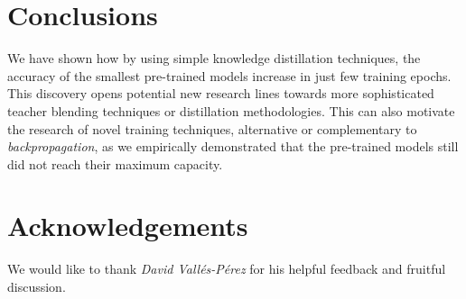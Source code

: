 \documentclass{elsarticle}
\begin{document}
	\section{Conclusions}  \label{sec:conclusions}
	We have shown how by using simple knowledge distillation techniques, the accuracy of the smallest pre-trained models increase in just few training epochs. This discovery opens potential new research lines towards more sophisticated teacher blending techniques or distillation methodologies. This can also motivate the research of novel training techniques, alternative or complementary to \textit{backpropagation}, as we empirically demonstrated that the pre-trained models still did not reach their maximum capacity.


	\section{Acknowledgements}
	We would like to thank \textit{David Vallés-Pérez} for his helpful feedback and fruitful discussion.
	\newpage

	
	
	
	\newpage
	
\end{document}
